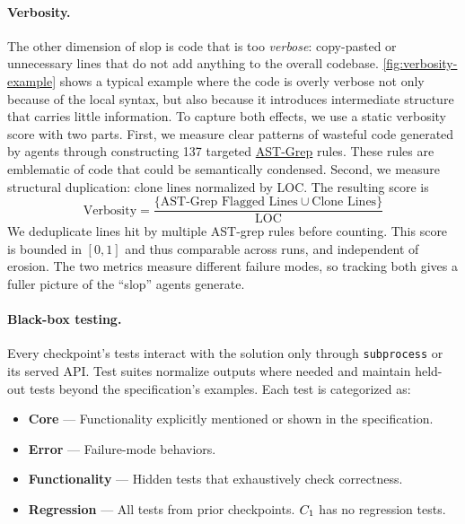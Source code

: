 \paragraph{Verbosity.} The other dimension of slop is code that is too \emph{verbose}: copy-pasted or unnecessary lines that do not add anything to the overall codebase. \autoref{fig:verbosity-example} shows a typical example where the code is overly verbose not only because of the local syntax, but also because it introduces intermediate structure that carries little information. To capture both effects, we use a static verbosity score with two parts. First, we measure clear patterns of wasteful code generated by agents through constructing 137 targeted \href{https://ast-grep.github.io}{AST-Grep} rules. These rules are emblematic of code that could be semantically condensed. Second, we measure structural duplication: clone lines normalized by LOC. The resulting score is
\begin{equation}
\label{eq:verbosity}
\text{Verbosity}
= \frac{\{\text{AST-Grep Flagged Lines} \cup \text{Clone Lines}\}}{\text{LOC}}
\end{equation}
We deduplicate lines hit by multiple AST-grep rules before counting. This score is bounded in $[0,1]$ and thus comparable across runs, and independent of erosion. The two metrics measure different failure modes, so tracking both gives a fuller picture of the ``slop'' agents generate.


\paragraph{Black-box testing.}\label{sec:black-box-testing} Every checkpoint's tests interact with the solution only through \texttt{subprocess} or its served API. Test suites normalize outputs where needed and maintain held-out tests beyond the specification's examples. Each test is categorized as:
\begin{itemize}
    \item \textbf{Core} --- Functionality explicitly mentioned or shown in the specification.
    \item \textbf{Error} --- Failure-mode behaviors.
    \item \textbf{Functionality} --- Hidden tests that exhaustively check correctness.
    \item \textbf{Regression} --- All tests from prior checkpoints. $C_{1}$ has no regression tests.
\end{itemize}

